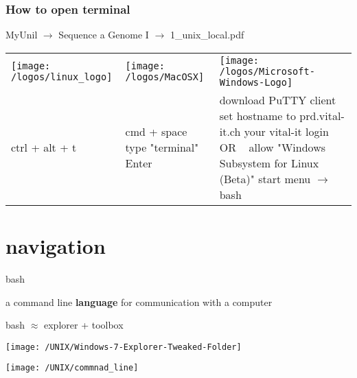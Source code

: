 \documentclass[xcolor=dvipsnames]{beamer}
\begin{document}
\begin{frame}
	\frametitle{How to open terminal}

	\begin{center}
		MyUnil $\rightarrow$ Sequence a Genome I $\rightarrow$ 1\_unix\_local.pdf
	\end{center}

	\small
	\begin{tabular}{C{0.3\textwidth} | C{0.3\textwidth} | C{0.3\textwidth}}
	 	 \texttt{[image: /logos/linux\_logo]} &
		 \texttt{[image: /logos/MacOSX]} &
		 \texttt{[image: /logos/Microsoft-Windows-Logo]} \\
		 ctrl + alt + t &
		 cmd + space \newline type "terminal" \newline Enter &
		 download PuTTY client \newline set hostname to prd.vital-it.ch \newline your vital-it login \newline
		 ~ \newline OR \newline ~ \newline
		 allow "Windows Subsystem for Linux (Beta)" \newline start menu $\rightarrow$ bash\\
	\end{tabular}

\end{frame}

\section{navigation}

\begin{frame}
	\Huge
	\begin{center}
		bash
	\end{center}
	\large
	a command line \textbf{language} for communication with a computer
\end{frame}

\begin{frame}
	bash $\approx$ explorer + toolbox
	\begin{center}
		\texttt{[image: /UNIX/Windows-7-Explorer-Tweaked-Folder]}
	\end{center}
\end{frame}

\begin{frame}
	\begin{center}
		\texttt{[image: /UNIX/commnad\_line]}
	\end{center}
\end{frame}
\end{document}

